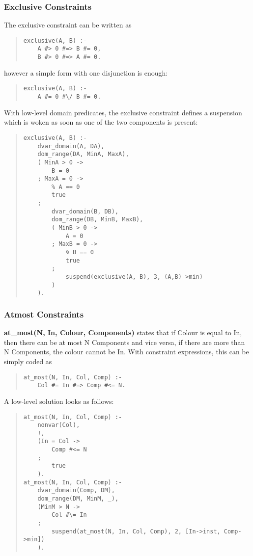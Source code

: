 \subsubsection{Exclusive Constraints}
The exclusive constraint can be written as
\begin{quote}
\begin{verbatim}
exclusive(A, B) :-
    A #> 0 #=> B #= 0,
    B #> 0 #=> A #= 0.
\end{verbatim}
\end{quote}
however a simple form with one disjunction is enough:
\begin{quote}
\begin{verbatim}
exclusive(A, B) :-
    A #= 0 #\/ B #= 0.
\end{verbatim}
\end{quote}

With low-level domain predicates,
the exclusive constraint defines a suspension which is woken
as soon as one of the two components is present:
\begin{quote}
\begin{verbatim}
exclusive(A, B) :-
    dvar_domain(A, DA),
    dom_range(DA, MinA, MaxA),
    ( MinA > 0 ->
        B = 0
    ; MaxA = 0 ->
        % A == 0
        true
    ;
        dvar_domain(B, DB),
        dom_range(DB, MinB, MaxB),
        ( MinB > 0 ->
            A = 0
        ; MaxB = 0 ->
            % B == 0
            true
        ;
            suspend(exclusive(A, B), 3, (A,B)->min)
        )
    ).
\end{verbatim}
\end{quote}

\subsubsection{Atmost Constraints}
{\bf at_most(N, In, Colour, Components)} states that if Colour
is equal to In, then there can be at most N Components
and vice versa, if there are more than N Components, the colour
cannot be In.
With constraint expressions, this can be simply coded as
\begin{quote}
\begin{verbatim}
at_most(N, In, Col, Comp) :-
    Col #= In #=> Comp #<= N.
\end{verbatim}
\end{quote}

A low-level solution looks as follows:
\begin{quote}
\begin{verbatim}
at_most(N, In, Col, Comp) :-
    nonvar(Col),
    !,
    (In = Col ->
        Comp #<= N
    ;
        true
    ).
at_most(N, In, Col, Comp) :-
    dvar_domain(Comp, DM),
    dom_range(DM, MinM, _),
    (MinM > N ->
        Col #\= In
    ;
        suspend(at_most(N, In, Col, Comp), 2, [In->inst, Comp->min])
    ).
\end{verbatim}
\end{quote}

